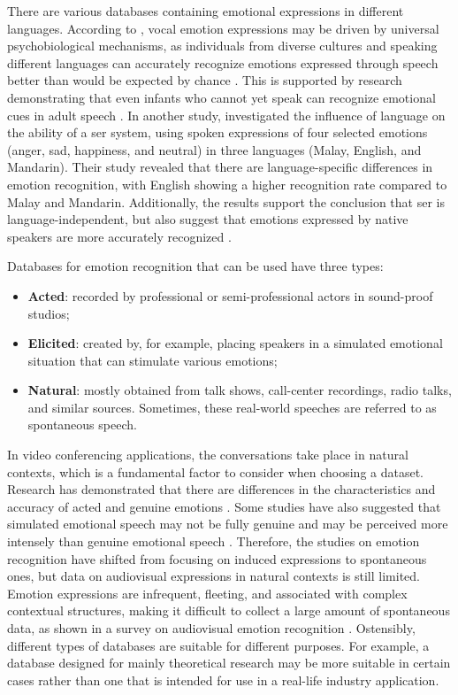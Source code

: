 There are various databases containing emotional expressions in different languages. According to \citeauthor{Scherer2000ACI}, vocal emotion expressions may be driven by universal psychobiological mechanisms, as individuals from diverse cultures and speaking different languages can accurately recognize emotions expressed through speech better than would be expected by chance \cite{Scherer2000ACI}. This is supported by research demonstrating that even infants who cannot yet speak can recognize emotional cues in adult speech \cite{Slaney}. In another study, \citeauthor{Rajoo2016} investigated the influence of language on the ability of a \ac{ser} system, using spoken expressions of four selected emotions (anger, sad, happiness, and neutral) in three languages (Malay, English, and Mandarin). Their study revealed that there are language-specific differences in emotion recognition, with English showing a higher recognition rate compared to Malay and Mandarin. Additionally, the results support the conclusion that \ac{ser} is language-independent, but also suggest that emotions expressed by native speakers are more accurately recognized \cite{Rajoo2016}.

Databases for emotion recognition that can be used have three types:
\begin{itemize}
	\item \textbf{Acted}: recorded by professional or semi-professional actors in sound-proof studios;
	\item \textbf{Elicited}: created by, for example, placing speakers in a simulated emotional situation that can stimulate various emotions;
	\item \textbf{Natural}: mostly obtained from talk shows, call-center recordings, radio talks, and similar sources. Sometimes, these real-world speeches are referred to as spontaneous speech.
\end{itemize}

In video conferencing applications, the conversations take place in natural contexts, which is a fundamental factor to consider when choosing a dataset. Research has demonstrated that there are differences in the characteristics and accuracy of acted and genuine emotions \cite{Vogt}. Some studies have also suggested that simulated emotional speech may not be fully genuine and may be perceived more intensely than genuine emotional speech \cite{2041ade4b5294db59df9f67e9c854632}. Therefore, the studies on emotion recognition have shifted from focusing on induced expressions to spontaneous ones, but data on audiovisual expressions in natural contexts is still limited. Emotion expressions are infrequent, fleeting, and associated with complex contextual structures, making it difficult to collect a large amount of spontaneous data, as shown in a survey on audiovisual emotion recognition \cite{Wu2014}. Ostensibly, different types of databases are suitable for different purposes. For example, a database designed for mainly theoretical research may be more suitable in certain cases rather than one that is intended for use in a real-life industry application.

